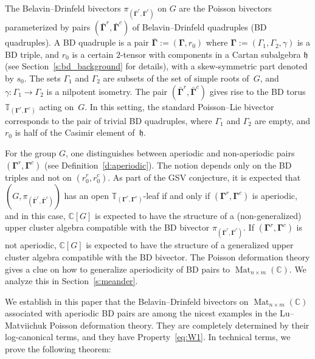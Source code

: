 \documentclass[11pt]{article}
\newcommand{\bbg}{\bar{\mathbf{\Gamma}}}
\newcommand{\bg}{\mathbf{\Gamma}}
\DeclareMathOperator{\Mat}{Mat}
\theoremstyle{definition}\newtheorem{definition}[theorem]{Definition}
\theoremstyle{definition}\newtheorem{remark}[theorem]{Remark}
\theoremstyle{remark}
\numberwithin{equation}{section}
\begin{document}
The Belavin--Drinfeld bivectors $\pi_{(\bbg^r,\bbg^c)}$ on $G$ are the Poisson bivectors parameterized by pairs $(\bbg^r,\bbg^c)$ of Belavin--Drinfeld quadruples (BD quadruples). A BD quadruple is a pair $\bbg:=(\bg,r_0)$ where $\bg:=(\Gamma_1,\Gamma_2,\gamma)$ is a BD triple, and $r_0$ is a certain $2$-tensor with components in a Cartan subalgebra $\mathfrak{h}$ (see Section~\ref{s:bd_background} for details), with a skew-symmetric part denoted by $s_0$. The sets $\Gamma_1$ and $\Gamma_2$ are subsets of the set of simple roots of~$G$, and $\gamma : \Gamma_1 \rightarrow \Gamma_2$ is a nilpotent isometry. The pair $(\bbg^r,\bbg^c)$ gives rise to the BD torus $\mathbb{T}_{(\bg^r,\bg^c)}$ acting on~$G$. In this setting, the standard Poisson--Lie bivector corresponds to the pair of trivial BD quadruples, where $\Gamma_1$ and $\Gamma_2$ are empty, and $r_0$ is half of the Casimir element of~$\mathfrak{h}$.

For the group $G$, one distinguishes between aperiodic and non-aperiodic pairs $(\bg^r,\bg^c)$ (see Definition~\ref{d:aperiodic}). The notion depends only on the BD triples and not on $(r_0^r,r_0^c)$. As part of the GSV conjecture, it is expected that $(G,\pi_{(\bbg^r,\bbg^c)})$ has an open $\mathbb{T}_{(\bg^r,\bg^c)}$-leaf if and only if $(\bg^r,\bg^c)$ is aperiodic, and in this case, $\mathbb{C}[G]$ is expected to have the structure of a (non-generalized) upper cluster algebra compatible with the BD bivector $\pi_{(\bbg^r,\bbg^c)}$. If $(\bg^r,\bg^c)$ is not aperiodic, $\mathbb{C}[G]$ is expected to have the structure of a generalized upper cluster algebra compatible with the BD bivector. The Poisson deformation theory gives a clue on how to generalize aperiodicity of BD pairs to $\Mat_{n\times m}(\mathbb{C})$. We analyze this in Section~\ref{s:meander}.

We establish in this paper that the Belavin--Drinfeld bivectors on $\Mat_{n\times m}(\mathbb{C})$ associated with aperiodic BD pairs are among the nicest examples in the Lu--Matviichuk Poisson deformation theory. They are completely determined by their log-canonical terms, and they have Property~\eqref{eq:W1}. In technical terms, we prove the following theorem:
\end{document}
